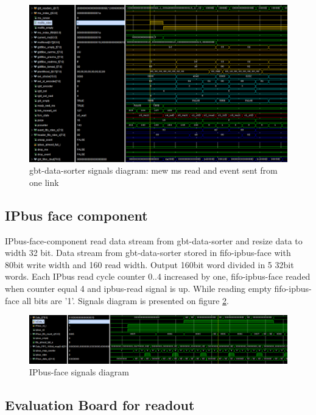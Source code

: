 \documentclass{article}
\begin{document}
\begin{figure}[H]
	\centering 
	\includegraphics[width=1.0\textwidth]{gbt-sorter-waves.png}
	\caption{\label{fig:10} gbt-data-sorter signals diagram: mew ms read and event sent from one link }
\end{figure}


\subsection{IPbus face component}
IPbus-face-component read data stream from gbt-data-sorter and resize data to width 32 bit. Data stream from gbt-data-sorter stored in fifo-ipbus-face with 80bit write width and 160 read width. Output 160bit word divided in 5 32bit words. Each IPbus read cycle counter 0..4 increased by one, fifo-ipbus-face readed when counter equal 4 and ipbus-read signal is up. While reading empty fifo-ipbus-face all bits are '1'. Signals diagram is presented on figure \ref{fig:11}.

\begin{figure}[H]
	\centering 
	\includegraphics[width=1.0\textwidth]{ipbus-face-waves.png}
	\caption{\label{fig:11} IPbus-face signals diagram }
\end{figure}


\subsection{Evaluation Board for readout}
\end{document}
